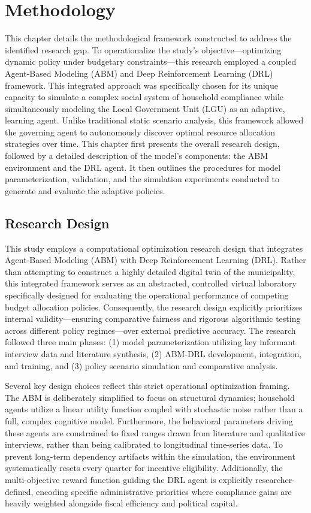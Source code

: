 \chapter{Methodology}

This chapter details the methodological framework constructed to address the identified research gap. To operationalize the study's objective—optimizing dynamic policy under budgetary constraints—this research employed a coupled Agent-Based Modeling (ABM) and Deep Reinforcement Learning (DRL) framework. This integrated approach was specifically chosen for its unique capacity to simulate a complex social system of household compliance while simultaneously modeling the Local Government Unit (LGU) as an adaptive, learning agent. Unlike traditional static scenario analysis, this framework allowed the governing agent to autonomously discover optimal resource allocation strategies over time. This chapter first presents the overall research design, followed by a detailed description of the model's components: the ABM environment and the DRL agent. It then outlines the procedures for model parameterization, validation, and the simulation experiments conducted to generate and evaluate the adaptive policies.

\section{Research Design}
\setlength{\parindent}{2em}

This study employs a computational optimization research design that integrates Agent-Based Modeling (ABM) with Deep Reinforcement Learning (DRL). Rather than attempting to construct a highly detailed digital twin of the municipality, this integrated framework serves as an abstracted, controlled virtual laboratory specifically designed for evaluating the operational performance of competing budget allocation policies. Consequently, the research design explicitly prioritizes internal validity—ensuring comparative fairness and rigorous algorithmic testing across different policy regimes—over external predictive accuracy. The research followed three main phases: (1) model parameterization utilizing key informant interview data and literature synthesis, (2) ABM-DRL development, integration, and training, and (3) policy scenario simulation and comparative analysis.

Several key design choices reflect this strict operational optimization framing. The ABM is deliberately simplified to focus on structural dynamics; household agents utilize a linear utility function coupled with stochastic noise rather than a full, complex cognitive model. Furthermore, the behavioral parameters driving these agents are constrained to fixed ranges drawn from literature and qualitative interviews, rather than being calibrated to longitudinal time-series data. To prevent long-term dependency artifacts within the simulation, the environment systematically resets every quarter for incentive eligibility. Additionally, the multi-objective reward function guiding the DRL agent is explicitly researcher-defined, encoding specific administrative priorities where compliance gains are heavily weighted alongside fiscal efficiency and political capital.

